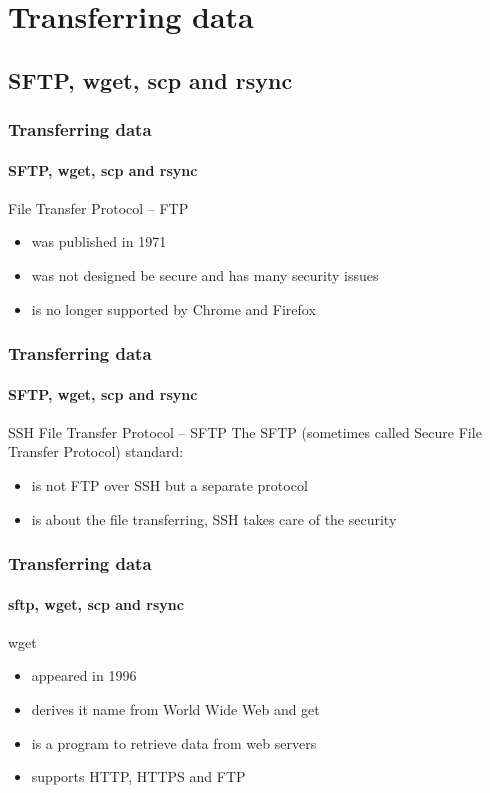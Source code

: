 \documentclass[aspectratio=169,usenames,dvipsnames]{beamer}
\begin{document}
\section{Transferring data}
    \subsection{SFTP, wget, scp and rsync}
    \begin{frame}
        \frametitle{Transferring data}
        \framesubtitle{SFTP, wget, scp and rsync}
        \begin{block}{File Transfer Protocol -- FTP}
        \begin{itemize}
            \item was \alert{published in 1971}
            \item was not designed be secure and has \alert{many security issues}
            \item is \alert{no longer supported by Chrome and Firefox} 
        \end{itemize}
        \end{block}
    \end{frame}
    \begin{frame}
        \frametitle{Transferring data}
        \framesubtitle{SFTP, wget, scp and rsync}
        \begin{block}{SSH File Transfer Protocol -- SFTP}
        The SFTP (sometimes called Secure File Transfer Protocol) standard:
        \begin{itemize}
            \item is not FTP over SSH but a separate protocol
            \item is about the file transferring, SSH takes care of the security 
        \end{itemize}
        \end{block}
    \end{frame}
    \begin{frame}
        \frametitle{Transferring data}
        \framesubtitle{sftp, wget, scp and rsync}
        \begin{block}{wget}
            \begin{itemize}
                \item appeared in 1996
                \item derives it name from World Wide Web and get
                \item is a program to retrieve data from web servers
                \item supports HTTP, HTTPS and FTP
            \end{itemize}
        \end{block}
    \end{frame}
\end{document}
